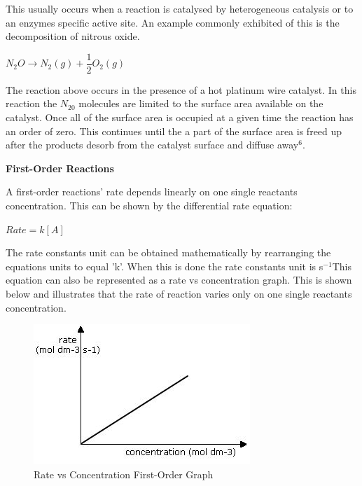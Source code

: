 This usually occurs when a reaction is catalysed by heterogeneous catalysis or to an enzymes specific active site. An example commonly exhibited of this is the decomposition of nitrous oxide.

$N_2O \rightarrow N_2(g) + \dfrac{1}{2} O_2(g)$

The reaction above occurs in the presence of a hot platinum wire catalyst. In this reaction the $N_20$ molecules are limited to the surface area available on the catalyst. Once all of the surface area is occupied at a given time the reaction has an order of zero. This continues until the a part of the surface area is freed up after the products desorb from the catalyst surface and diffuse away$^6$.



\textbf{First-Order Reactions}

A first-order reactions' rate depends linearly on one single reactants concentration. This can be shown by the differential rate equation:

$Rate = k[A]$

The rate constants unit can be obtained mathematically by rearranging the equations units to equal 'k'. When this is done the rate constants unit is s$^{-1}$This equation can also be represented as a rate vs concentration graph. This is shown below and illustrates that the rate of reaction varies only on one single reactants concentration.


\begin{figure}[H]
    \includegraphics[width=\textwidth]{./Planning/Images/FirstOrder.jpg}
    \caption{ Rate vs Concentration First-Order Graph} \label{fig:First Order Graph}
\end{figure}

